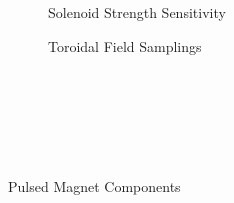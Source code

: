\begin{figure}
    \centering
    \hfill 
    \begin{subfigure}[t]{0.42\textwidth}
        \centering
    \begin{adjustbox}{width=\textwidth}
      \Large
      
    \end{adjustbox}
        \caption{Solenoid Strength Sensitivity}
    \end{subfigure}
    \hfill
    \begin{subfigure}[t]{0.48\textwidth}
        \centering
    \begin{adjustbox}{width=\textwidth}
      \Large
      
    \end{adjustbox}
        \caption{Toroidal Field Samplings}
    \end{subfigure}
    \hfill \hfill ~\\ ~\\ ~\\
    \caption{Pulsed Magnet Components} ~\\
    \label{fig:charybdis}
\end{figure}
